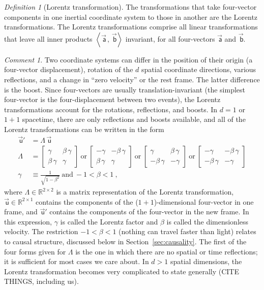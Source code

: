 \documentclass[10pt]{article}
\newcommand{\secref}[1]{Section~\ref{#1}}
\theoremstyle{remark}
\newtheorem{definition}{Definition}
\theoremstyle{remark}
\newtheorem*{remark}{Comment}
\newcommand\upvec[1]{\!\vec{\,\mathrm{#1}}}
\newcommand{\fv}[1]{\upvec{\mathsf{#1}}} %
\newcommand{\inner}[2]{\left<{#1}\,,\,{#2}\right>}
\begin{document}
\begin{definition}[Lorentz transformation]\label{def:lt}
    The transformations that take four-vector components in one inertial coordinate system to those in another are the Lorentz transformations.
    The Lorentz transformations comprise all linear transformations that leave all inner products $\inner{\fv{a}}{\fv{b}}$ invariant, for all four-vectors $\fv{a}$ and $\fv{b}$.
\end{definition}
\begin{remark}
    Two coordinate systems can differ in the position of their origin (a four-vector displacement), rotation of the $d$ spatial coordinate directions, various reflections, and a change in ``zero velocity'' or the rest frame.
    The latter difference is the boost.
    Since four-vectors are usually translation-invariant (the simplest four-vector is the four-displacement between two events), the Lorentz transformations account for the rotations, reflections, and boosts.
    In $d=1$ or $1+1$ spacetime, there are only reflections and boosts available, and all of the Lorentz transformations can be written in the form
    \begin{align}
    \fv{u}' &= \Lambda\,\fv{u} \\
    \Lambda &= \begin{bmatrix}\gamma & \beta\,\gamma \\ \beta\,\gamma & \gamma\end{bmatrix} ~\mbox{or}~
    \begin{bmatrix}-\gamma & -\beta\,\gamma \\ \beta\,\gamma & \gamma\end{bmatrix} ~\mbox{or}~
    \begin{bmatrix}\gamma & \beta\,\gamma \\ -\beta\,\gamma & -\gamma\end{bmatrix}  ~\mbox{or}~
    \begin{bmatrix}-\gamma & -\beta\,\gamma \\ -\beta\,\gamma & -\gamma\end{bmatrix} \label{eq:o11}
    \\
    \gamma &\equiv \frac{1}{\sqrt{1 - \beta^2}} ~ \mbox{and} ~ -1 < \beta < 1 ~,\nonumber
    \end{align}
    where $\Lambda\in\mathbb{R}^{2\times 2}$ is a matrix representation of the Lorentz transformation, $\fv{u}\in\mathbb{R}^{2\times 1}$ contains the components of the ($1+1$)-dimensional four-vector in one frame, and $\fv{u}'$ contains the components of the four-vector in the new frame.
    In this expression, $\gamma$ is called the Lorentz factor and $\beta$ is called the dimensionless velocity.
    The restriction $-1 < \beta < 1$ (nothing can travel faster than light) relates to causal structure, discussed below in \secref{sec:causality}.
    The first of the four forms given for $\Lambda$ is the one in which there are no spatial or time reflections; it is sufficient for most cases we care about.
    In $d>1$ spatial dimensions, the Lorentz transformation becomes very complicated to state generally (CITE THINGS, including us).
\end{remark}
\end{document}
